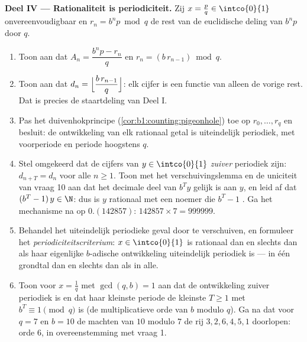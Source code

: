 \begin{problem}
\medskip
\noindent\textbf{Deel IV --- Rationaliteit is periodiciteit.} Zij $x =
\frac pq \in \intco{0}{1}$ onvereenvoudigbaar en $r_n = b^n p \bmod q$ de
rest van de euclidische deling van $b^n p$ door $q$.
\begin{enumerate}[resume]
  \item Toon aan dat $A_n = \dfrac{b^n p - r_n}{q}$ en $r_n =
        (b\,r_{n-1}) \bmod q$.
  \item Toon aan dat $d_n = \Bigl\lfloor \dfrac{b\,r_{n-1}}{q}
        \Bigr\rfloor$: elk cijfer is een functie van alleen de vorige
        rest. Dat is precies de staartdeling van Deel I.
  \item Pas het duivenhokprincipe (\cref{cor:b1:counting:pigeonhole})
        toe op $r_0, \dots, r_q$ en besluit: de ontwikkeling van elk
        rationaal getal is uiteindelijk periodiek, met voorperiode en
        periode hoogstens $q$.
  \item Stel omgekeerd dat de cijfers van $y \in \intco{0}{1}$
        \emph{zuiver} periodiek zijn: $d_{n+T} = d_n$ voor alle $n \geq
        1$. Toon met het verschuivingslemma en de uniciteit van vraag 10
        aan dat het decimale deel van $b^T y$ gelijk is aan $y$, en leid
        af dat $(b^T - 1)\,y \in \N$: dus is $y$ rationaal met een
        noemer die $b^T - 1$ . Ga het mechanisme na op
        $0.(142857)$: $142857 \times 7 = 999999$.
  \item Behandel het uiteindelijk periodieke geval door te verschuiven,
        en formuleer het \emph{periodiciteitscriterium}: $x \in
        \intco{0}{1}$ is rationaal dan en slechts dan als haar
        eigenlijke $b$-adische ontwikkeling uiteindelijk periodiek is
        --- in één grondtal dan en slechts dan als in alle.
  \item Toon voor $x = \frac 1q$ met $\gcd(q, b) = 1$ aan dat de
        ontwikkeling zuiver periodiek is en dat haar kleinste periode de
        kleinste $T \geq 1$ met $b^T \equiv 1 \pmod q$ is (de
        multiplicatieve orde van $b$ modulo $q$). Ga na dat voor $q = 7$
        en $b = 10$ de machten van $10$ modulo $7$ de rij $3, 2, 6, 4,
        5, 1$ doorlopen: orde $6$, in overeenstemming met vraag 1.
\end{enumerate}


\end{problem}

